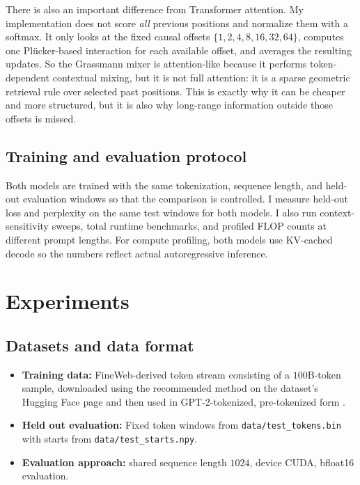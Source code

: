 \documentclass{article}
\begin{document}
There is also an important difference from Transformer attention. My implementation does not score \emph{all} previous positions and normalize them with a softmax. It only looks at the fixed causal offsets \(\{1,2,4,8,16,32,64\}\), computes one Pl\"ucker-based interaction for each available offset, and averages the resulting updates. So the Grassmann mixer is attention-like because it performs token-dependent contextual mixing, but it is not full attention: it is a sparse geometric retrieval rule over selected past positions. This is exactly why it can be cheaper and more structured, but it is also why long-range information outside those offsets is missed.

\subsection{Training and evaluation protocol}
Both models are trained with the same tokenization, sequence length, and held-out evaluation windows so that the comparison is controlled. I measure held-out loss and perplexity on the same test windows for both models. I also run context-sensitivity sweeps, total runtime benchmarks, and profiled FLOP counts at different prompt lengths. For compute profiling, both models use KV-cached decode so the numbers reflect actual autoregressive inference.

\section{Experiments}

\subsection{Datasets and data format}
\begin{itemize}
    \item \textbf{Training data:} FineWeb-derived token stream consisting of a \(100\)B-token sample, downloaded using the recommended method on the dataset's Hugging Face page and then used in GPT-2-tokenized, pre-tokenized form \cite{penedo2024the}.
    \item \textbf{Held out evaluation:} Fixed token windows from \texttt{data/test\_tokens.bin} with starts from \texttt{data/test\_starts.npy}.
    \item \textbf{Evaluation approach:} shared sequence length \(1024\), device CUDA, bfloat16 evaluation.
\end{itemize}
\end{document}
